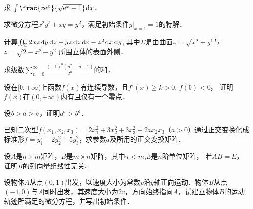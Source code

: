 \documentclass[plain,noanswer,medmath]{../../template/jnuexam}
\begin{document}
\begin{problem}
求 $\int \frac{x\e^x}{\sqrt{\e^x - 1}}\dx$．
\end{problem}


\begin{problem}
求微分方程$x^2 y' + xy = y^2$，满足初始条件$y|_{x = 1} = 1$的特解．
\end{problem}



\begin{problem}
计算$\iint_{\Sigma}2xz\mathop{}\!\mathrm{d} y\mathop{}\!\mathrm{d} z + yz\mathop{}\!\mathrm{d} z\mathop{}\!\mathrm{d} x - z^2 \mathop{}\!\mathrm{d} x\mathop{}\!\mathrm{d} y$,
其中$\Sigma$是由曲面$z = \sqrt{x^2 + y^2}$与$z = \sqrt{2 - x^2 - y^2}$ 所围立体的表面外侧．
\end{problem}



\begin{problem}
求级数$\sum_{n = 0}^{\infty}\frac{(- 1)^n(n^2 - n + 1)}{2^n}$的和．
\end{problem}




\begin{problem}
设在$[0,+\infty)$上函数$f(x)$有连续导数，且$f'(x) \ge k > 0$, $f(0) < 0$，
证明$f(x)$在$(0,+\infty)$内有且仅有一个零点．
\end{problem}


\begin{problem}
设$b > a > \mathrm{e}$，证明$a^b > b^a$．
\end{problem}



\begin{problem}
已知二次型$f(x_1,x_2,x_3) = 2x_1^2+ 3x_2^2+ 3x_3^2+ 2ax_2x_3$（$a > 0$）通过正交变换化成标准形$f = y_1^2+ 2y_2^2+ 5y_3^2$，求参数$a$及所用的正交变换矩阵．
\end{problem}



\begin{problem}
设$A$是$n \times m$矩阵，$B$是$m \times n$矩阵，其中$n < m$,$E$是$n$阶单位矩阵，
若$AB = E$，证明$B$的列向量组线性无关．
\end{problem}



\begin{problem}
设物体$A$从点$(0,1)$出发，以速度大小为常数$v$沿$y$轴正向运动．物体$B$从点$(- 1,0)$与$A$同时出发，其速度大小为$2v$，方向始终指向$A$，试建立物体$B$的运动轨迹所满足的微分方程，并写出初始条件．
\end{problem}
\end{document}
